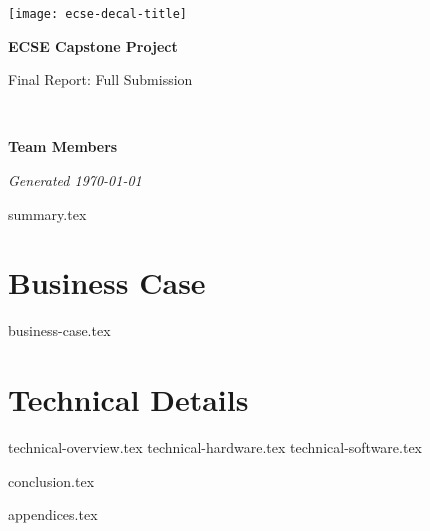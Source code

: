 \documentclass{capstone}
\begin{document}

\titlepage
	{\texttt{[image: ecse-decal-title]}}
	{
		\centering\sffamily
		{\Huge\bfseries ECSE Capstone Project\par}
		\vspace{16pt} 
		{\LARGE Final Report: Full Submission\par} 
		\vspace{24pt}
		{\huge\bfseries \teamname\par} %
	}


~\vfill

\noindent \textbf{Team Members}
\teammembers

\noindent \textit{Generated \today}

\tableofcontents

\cleardoublepage
{summary.tex}

\cleardoublepage

\part{Business Case}
{business-case.tex}

\part{Technical Details}
{technical-overview.tex}
{technical-hardware.tex}
{technical-software.tex}

\cleardoublepage

{conclusion.tex}

\begin{appendices}
{appendices.tex}
\end{appendices}
\end{document}
